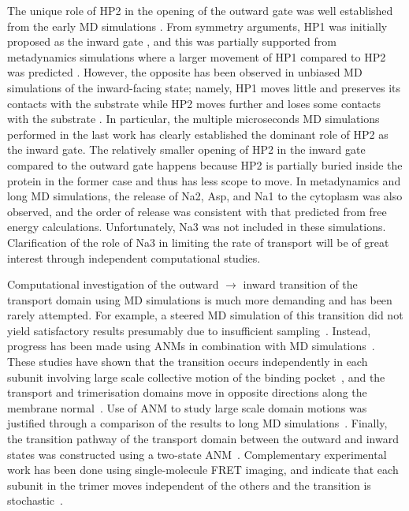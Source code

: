 The unique role of HP2 in the opening of the outward gate was well established from 
the early MD simulations \cite{Shrivastava2008,Huang2008}. From symmetry 
arguments, HP1 was initially proposed as the inward gate 
\cite{Reyes2009,Crisman2009}, and this was partially supported from metadynamics 
simulations where a larger movement of HP1 compared to HP2 was predicted 
\cite{Grazioso2012}. However, the opposite has been observed in unbiased MD 
simulations of the inward-facing state; namely, HP1 moves little and preserves 
its contacts with the substrate while HP2 moves further and loses some contacts 
with the substrate \cite{DeChancie2011a,Zomot2013,Heinzelmann2013}. In 
particular, the multiple microseconds MD simulations performed in the last work 
\cite{Zomot2013} has clearly established the dominant role of HP2 as the inward  
gate. The relatively smaller opening of HP2 in the inward gate compared to the 
outward gate happens because HP2 is partially buried inside the protein in the 
former case and thus has less scope to move.
In metadynamics \cite{Grazioso2012} and long MD \cite{Zomot2013} simulations, 
the release of Na2, Asp, and Na1 to the cytoplasm was also observed, and the order 
of release was consistent with that predicted from free energy calculations. 
Unfortunately, Na3 was not included in these simulations. Clarification of the 
role of Na3 in limiting the rate of transport will be of great interest 
through independent computational studies.

Computational investigation of the outward $\to$ inward transition of the 
transport domain using MD simulations is much more demanding and has been 
rarely attempted. For example, a steered MD simulation of this transition did 
not yield satisfactory results presumably due to insufficient sampling~\cite{Gu2009}. 
Instead, progress has been made using ANMs in combination with MD 
simulations~\cite{Jiang2011,Stolzenberg2012,Gur2013,Das2014}. These studies have 
shown that the transition occurs independently in each subunit involving large 
scale collective motion of the binding pocket~\cite{Jiang2011}, and the 
transport and trimerisation domains move in opposite directions along the 
membrane normal~\cite{Stolzenberg2012}. Use of ANM to study large scale domain 
motions was justified through a comparison of the results to long MD simulations~\cite{Gur2013}. 
Finally, the transition pathway of the transport domain between the outward and 
inward states was constructed using a two-state ANM~\cite{Das2014}. Complementary 
experimental work has been done using single-molecule FRET imaging, and indicate 
that each subunit in the trimer moves independent of the others and the transition 
is stochastic~\cite{Erkens2013,Akyuz2013,Akyuz2015}.

